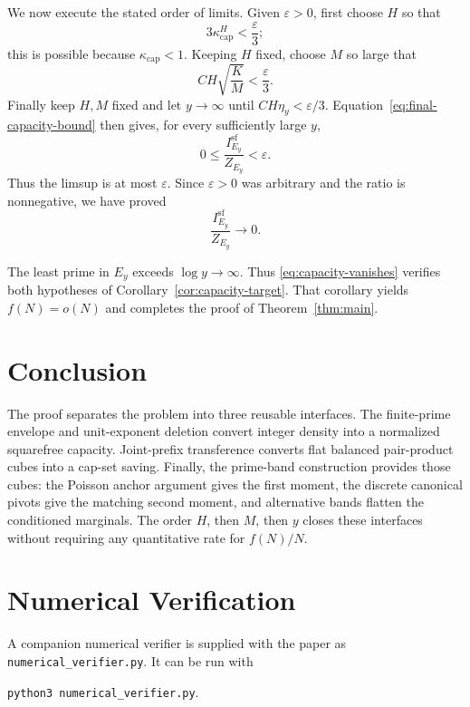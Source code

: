 \documentclass[11pt]{article}
\numberwithin{equation}{section}
\theoremstyle{plain}
\newcommand{\1}{\mathbf 1}
\newcommand{\eps}{\varepsilon}
\newcommand{\kappacap}{\kappa_{\mathrm{cap}}}
\begin{document}
We now execute the stated order of limits.  Given $\eps>0$, first choose
$H$ so that
\[
 3\kappacap^H<\frac{\eps}{3};
\]
this is possible because $\kappacap<1$.  Keeping $H$ fixed, choose $M$ so
large that
\[
 CH\sqrt{\frac KM}<\frac{\eps}{3}.
\]
Finally keep $H,M$ fixed and let $y\to\infty$ until
$CH\eta_y<\eps/3$.  Equation~\eqref{eq:final-capacity-bound} then gives,
for every sufficiently large $y$,
\[
 0\le\frac{I_{E_y}^{\mathrm{sf}}}{Z_{E_y}}<\eps.
\]
Thus the limsup is at most $\eps$.  Since $\eps>0$ was arbitrary and the
ratio is nonnegative, we have proved
\begin{equation}\label{eq:capacity-vanishes}
 \frac{I_{E_y}^{\mathrm{sf}}}{Z_{E_y}}\longrightarrow0.
\end{equation}

The least prime in $E_y$ exceeds $\log y\to\infty$.  Thus
\eqref{eq:capacity-vanishes} verifies both hypotheses of
Corollary~\ref{cor:capacity-target}.  That corollary yields
$f(N)=o(N)$ and completes the proof of Theorem~\ref{thm:main}.

\section{Conclusion}

The proof separates the problem into three reusable interfaces.  The
finite-prime envelope and unit-exponent deletion convert integer density
into a normalized squarefree capacity.  Joint-prefix transference converts
flat balanced pair-product cubes into a cap-set saving.  Finally, the
prime-band construction provides those cubes: the Poisson anchor argument
gives the first moment, the discrete canonical pivots give the matching
second moment, and alternative bands flatten the conditioned marginals.
The order $H$, then $M$, then $y$ closes these interfaces without requiring
any quantitative rate for $f(N)/N$.

\appendix
\section{Numerical Verification}\label{app:verification}

A companion numerical verifier is supplied with the paper as
\texttt{numerical\_verifier.py}.  It can be run with
\begin{center}
\texttt{python3 numerical\_verifier.py}.
\end{center}
\end{document}
